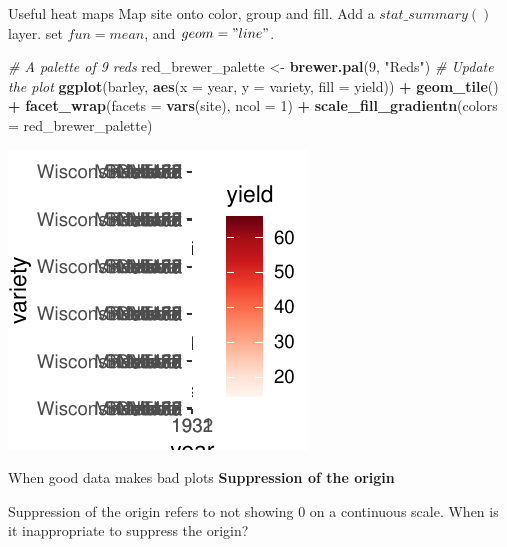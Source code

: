 \documentclass[
  ignorenonframetext,
]{beamer}
\newenvironment{Shaded}{\begin{snugshade}}{\end{snugshade}}
\newcommand{\AttributeTok}[1]{\textcolor[rgb]{0.13,0.29,0.53}{#1}}
\newcommand{\CommentTok}[1]{\textcolor[rgb]{0.56,0.35,0.01}{\textit{#1}}}
\newcommand{\DecValTok}[1]{\textcolor[rgb]{0.00,0.00,0.81}{#1}}
\newcommand{\FunctionTok}[1]{\textcolor[rgb]{0.13,0.29,0.53}{\textbf{#1}}}
\newcommand{\NormalTok}[1]{#1}
\newcommand{\OtherTok}[1]{\textcolor[rgb]{0.56,0.35,0.01}{#1}}
\newcommand{\SpecialCharTok}[1]{\textcolor[rgb]{0.81,0.36,0.00}{\textbf{#1}}}
\newcommand{\StringTok}[1]{\textcolor[rgb]{0.31,0.60,0.02}{#1}}
\begin{document}
\begin{frame}[fragile]{Useful heat maps}
\label{useful-heat-maps-6}
Map site onto color, group and fill. Add a \(stat\_summary()\) layer.
set \(fun = mean\), and \(geom = "line"\).


\begin{Shaded}
\begin{Highlighting}[]
\CommentTok{\# A palette of 9 reds}
\NormalTok{red\_brewer\_palette }\OtherTok{\textless{}{-}} \FunctionTok{brewer.pal}\NormalTok{(}\DecValTok{9}\NormalTok{, }\StringTok{"Reds"}\NormalTok{)}
\CommentTok{\# Update the plot}
\FunctionTok{ggplot}\NormalTok{(barley, }\FunctionTok{aes}\NormalTok{(}\AttributeTok{x =}\NormalTok{ year, }\AttributeTok{y =}\NormalTok{ variety, }\AttributeTok{fill =}\NormalTok{ yield)) }\SpecialCharTok{+} \FunctionTok{geom\_tile}\NormalTok{() }\SpecialCharTok{+}
    \FunctionTok{facet\_wrap}\NormalTok{(}\AttributeTok{facets =} \FunctionTok{vars}\NormalTok{(site), }\AttributeTok{ncol =} \DecValTok{1}\NormalTok{) }\SpecialCharTok{+} \FunctionTok{scale\_fill\_gradientn}\NormalTok{(}\AttributeTok{colors =}\NormalTok{ red\_brewer\_palette)}
\end{Highlighting}
\end{Shaded}

\begin{center}\includegraphics[width=0.5\linewidth]{Figs/unnamed-chunk-118-1} \end{center}
\end{frame}

\begin{frame}{When good data makes bad plots}
\label{when-good-data-makes-bad-plots}
\textbf{Suppression of the origin}

Suppression of the origin refers to not showing 0 on a continuous scale.
When is it inappropriate to suppress the origin?
\end{frame}
\end{document}
